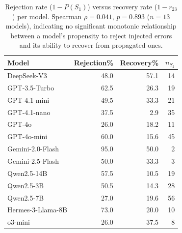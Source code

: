 \begin{table}[t]
\centering
\caption{Rejection rate ($1 - P(S_1)$) versus recovery rate ($1 - r_{23}$) per model. Spearman $\rho = 0.041$, $p = 0.893$ ($n = 13$ models), indicating no significant monotonic relationship between a model's propensity to reject injected errors and its ability to recover from propagated ones.}
\label{tab:rejection_recovery}
\begin{tabular}{l r r r}
\toprule
Model & Rejection\% & Recovery\% & $n_{S_2}$ \\
\midrule
DeepSeek-V3 & 48.0 & 57.1 & 14 \\
GPT-3.5-Turbo & 62.5 & 26.3 & 19 \\
GPT-4.1-mini & 49.5 & 33.3 & 21 \\
GPT-4.1-nano & 37.5 & 2.9 & 35 \\
GPT-4o & 26.0 & 18.2 & 11 \\
GPT-4o-mini & 60.0 & 15.6 & 45 \\
Gemini-2.0-Flash & 95.0 & 50.0 & 2 \\
Gemini-2.5-Flash & 50.0 & 33.3 & 3 \\
Qwen2.5-14B & 57.5 & 10.5 & 19 \\
Qwen2.5-3B & 50.5 & 14.3 & 28 \\
Qwen2.5-7B & 27.0 & 19.6 & 56 \\
Hermes-3-Llama-8B & 73.0 & 20.0 & 10 \\
o3-mini & 26.0 & 37.5 & 8 \\
\bottomrule
\end{tabular}
\end{table}